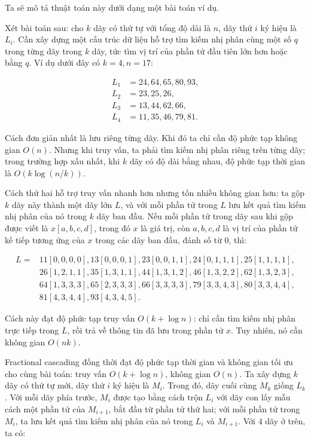 \documentclass[11pt]{article}
\begin{document}
Ta sẽ mô tả thuật toán này dưới dạng một bài toán ví dụ.

Xét bài toán sau: cho $k$ dãy có thứ tự với tổng độ dài là $n$, dãy thứ $i$ ký
hiệu là $L_i$. Cần xây dựng một cấu trúc dữ liệu hỗ trợ tìm kiếm nhị phân cùng
một số $q$ trong từng dãy trong $k$ dãy, tức tìm vị trí của phần tử đầu tiên lớn
hơn hoặc bằng $q$. Ví dụ dưới đây có $k=4, n=17$:

\[
\begin{aligned}
L_1 &= 24,64,65,80,93,\\
L_2 &= 23,25,26,\\
L_3 &= 13,44,62,66,\\
L_4 &= 11,35,46,79,81.
\end{aligned}
\]

Cách đơn giản nhất là lưu riêng từng dãy. Khi đó ta chỉ cần độ phức tạp không
gian $O(n)$. Nhưng khi truy vấn, ta phải tìm kiếm nhị phân riêng trên từng dãy;
trong trường hợp xấu nhất, khi $k$ dãy có độ dài bằng nhau, độ phức tạp thời
gian là $O(k\log(n/k))$.

Cách thứ hai hỗ trợ truy vấn nhanh hơn nhưng tốn nhiều không gian hơn: ta gộp
$k$ dãy này thành một dãy lớn $L$, và với mỗi phần tử trong $L$ lưu kết quả tìm
kiếm nhị phân của nó trong $k$ dãy ban đầu. Nếu mỗi phần tử trong dãy sau khi
gộp được viết là $x[a,b,c,d]$, trong đó $x$ là giá trị, còn $a,b,c,d$ là vị trí
của phần tử kế tiếp tương ứng của $x$ trong các dãy ban đầu, đánh số từ $0$,
thì:

\begin{small}
\[
\begin{aligned}
L={}&11[0,0,0,0],13[0,0,0,1],23[0,0,1,1],24[0,1,1,1],25[1,1,1,1],\\
&26[1,2,1,1],35[1,3,1,1],44[1,3,1,2],46[1,3,2,2],62[1,3,2,3],\\
&64[1,3,3,3],65[2,3,3,3],66[3,3,3,3],79[3,3,4,3],80[3,3,4,4],\\
&81[4,3,4,4],93[4,3,4,5].
\end{aligned}
\]
\end{small}

Cách này đạt độ phức tạp truy vấn $O(k+\log n)$: chỉ cần tìm kiếm nhị phân trực
tiếp trong $L$, rồi trả về thông tin đã lưu trong phần tử $x$. Tuy nhiên, nó cần
không gian $O(nk)$.

Fractional cascading đồng thời đạt độ phức tạp thời gian và không gian tối ưu
cho cùng bài toán: truy vấn $O(k+\log n)$, không gian $O(n)$. Ta xây dựng $k$
dãy có thứ tự mới, dãy thứ $i$ ký hiệu là $M_i$. Trong đó, dãy cuối cùng $M_k$
giống $L_k$. Với mỗi dãy phía trước, $M_i$ được tạo bằng cách trộn $L_i$ với
dãy con lấy mẫu cách một phần tử của $M_{i+1}$, bắt đầu từ phần tử thứ hai; với
mỗi phần tử trong $M_i$, ta lưu kết quả tìm kiếm nhị phân của nó trong $L_i$ và
$M_{i+1}$. Với 4 dãy ở trên, ta có:
\end{document}

